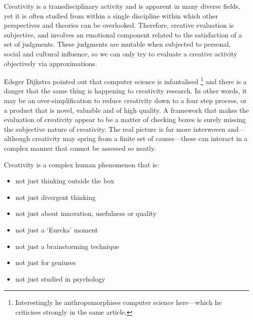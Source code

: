 Creativity is a transdisciplinary activity and is apparent in many diverse fields, yet it is often studied from within a single discipline within which other perspectives and theories can be overlooked. Therefore, creative evaluation is subjective, and involves an emotional component related to the satisfaction of a set of judgments. These judgments are mutable when subjected to personal, social and cultural influence, so we can only try to evaluate a creative activity objectively via approximations.

Edsger Dijkstra pointed out that computer science is infantalised \autocite*{Dijkstra1988}\footnote{Interestingly he anthropomorphises computer science here---which he criticises strongly in the same article.} and there is a danger that the same thing is happening to creativity research. In other words, it may be an over-simplification to reduce creativity down to a four step process, or a product that is novel, valuable and of high quality. A framework that makes the evaluation of creativity appear to be a matter of checking boxes is surely missing the subjective nature of creativity. The real picture is far more interwoven and---although creativity may spring from a finite set of causes---these can interact in a complex manner that cannot be assessed so neatly.

Creativity is a complex human phenomenon that is:

\begin{itemize}
  \item not just thinking outside the box
  \item not just divergent thinking
  \item not just about innovation, usefulness or quality
  \item not just a `Eureka' moment
  \item not just a brainstorming technique
  \item not just for geniuses
  \item not just studied in psychology
\end{itemize}







